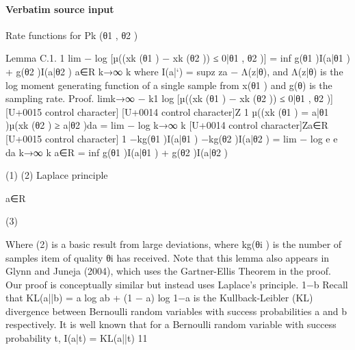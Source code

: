 \documentclass[10pt]{article}
\begin{document}
\paragraph{Verbatim source input}
\begin{ReviewVerbatim}
Rate functions for Pk (θ1 , θ2 )

Lemma C.1.
1
lim − log [µ((xk (θ1 ) − xk (θ2 )) ≤ 0|θ1 , θ2 )] = inf {g(θ1 )I(a|θ1 ) + g(θ2 )I(a|θ2 )}
a∈R
k→∞ k
where I(a|`) = supz {za − Λ(z|θ)}, and Λ(z|θ) is the log moment generating function of a single
sample from x(θ1 ) and g(θ) is the sampling rate.
Proof. limk→∞ − k1 log [µ((xk (θ1 ) − xk (θ2 )) ≤ 0|θ1 , θ2 )]
[U+0015 control character]
[U+0014 control character]Z
1
µ((xk (θ1 ) = a|θ1 )µ(xk (θ2 ) ≥ a|θ2 )da
= lim − log
k→∞ k
[U+0014 control character]Za∈R
[U+0015 control character]
1
−kg(θ1 )I(a|θ1 ) −kg(θ2 )I(a|θ2 )
= lim − log
e
e
da
k→∞ k
a∈R
= inf {g(θ1 )I(a|θ1 ) + g(θ2 )I(a|θ2 )}

(1)
(2)
Laplace principle

a∈R

(3)

Where (2) is a basic result from large deviations, where kg(θi ) is the number of samples item
of quality θi has received.
Note that this lemma also appears in Glynn and Juneja (2004), which uses the Gartner-Ellis
Theorem in the proof. Our proof is conceptually similar but instead uses Laplace’s principle.
1−b
Recall that KL(a||b) = a log ab + (1 − a) log 1−a
is the Kullback-Leibler (KL) divergence between
Bernoulli random variables with success probabilities a and b respectively. It is well known that
for a Bernoulli random variable with success probability t,
I(a|t) = KL(a||t)
11
\end{ReviewVerbatim}
\end{document}
